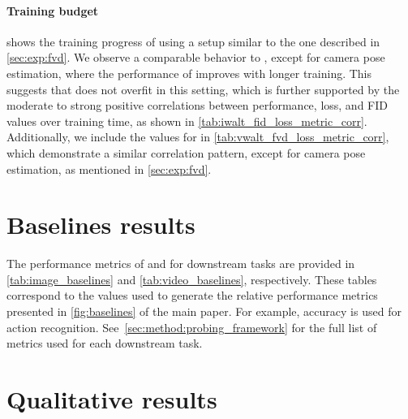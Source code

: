 

\paragraph{Training budget}
 shows the training progress of \iwalt using a setup similar to the one described in \cref{sec:exp:fvd}.  We observe a comparable behavior to \vwalt, except for camera pose estimation, where the performance of \iwalt improves with longer training. This suggests that \iwalt does not overfit in this setting, which is further supported by the moderate to strong positive correlations between performance, loss, and FID values over training time, as shown in \cref{tab:iwalt_fid_loss_metric_corr}. Additionally, we include the values for \vwalt in \cref{tab:vwalt_fvd_loss_metric_corr}, which demonstrate a similar correlation pattern, except for camera pose estimation, as mentioned in \cref{sec:exp:fvd}.





\section{Baselines results}
\label{app:sec:baseline_results}
The performance metrics of \iwalt and \vwalt for downstream tasks are provided in \cref{tab:image_baselines} and \cref{tab:video_baselines}, respectively. These tables correspond to the values used to generate the relative performance metrics presented in \cref{fig:baselines} of the main paper. For example, accuracy is used for \Tssv action recognition. See~\cref{sec:method:probing_framework} for the full list of metrics used for each downstream task.  

\section{Qualitative results}
\label{app:sec:qualitative_results}







